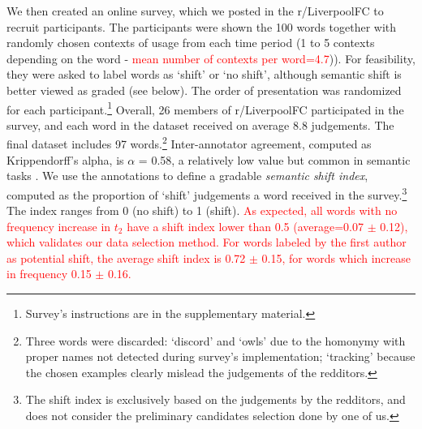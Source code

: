We then created an online survey, which we posted in the r/LiverpoolFC to recruit participants. The participants were shown the 100 words together with randomly chosen contexts of usage from each time period (1 to 5 contexts depending on the word - \textcolor{red}{mean number of contexts per word=4.7})). For feasibility, they were asked to label words as `shift' or `no shift', although semantic shift is better viewed as graded (see below). The order of presentation was randomized for each participant.\footnote{Survey's instructions are in the supplementary material.} Overall, 26 members of r/LiverpoolFC participated in the survey, and each word in the dataset received on average 8.8 judgements. The final dataset includes 97 words.\footnote{Three words were discarded: `discord'  and `owls' due to the homonymy with proper names not detected during survey's implementation; `tracking' because the chosen examples clearly mislead the judgements of the redditors.} Inter-annotator agreement, computed as Krippendorff's alpha, is $\alpha$ = 0.58, a relatively low value but common in semantic tasks \cite{artstein2008inter}.
We use the annotations to define a gradable \emph{semantic shift index}, computed as the proportion of `shift' judgements a word received in the survey.\footnote{The shift index is exclusively based on the judgements by the redditors, and does not consider the preliminary candidates selection done by one of us.} The index ranges from 0 (no shift) to 1 (shift). \textcolor{red}{As expected, all words with no frequency increase in $t_2$ have a shift index lower than 0.5 (average=0.07 $\pm$ 0.12), which validates our data selection method. For words labeled by the first author as potential shift, the average shift index is 0.72 $\pm$ 0.15, for words which increase in frequency 0.15 $\pm$ 0.16.}

